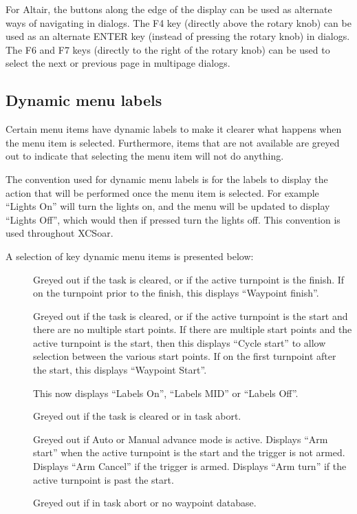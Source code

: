 \documentclass[a4paper,12pt]{refrep}
\begin{document}
For Altair, the buttons along the edge of the display can be used as
alternate ways of navigating in dialogs.  The F4 key (directly above
the rotary knob) can be used as an alternate ENTER key (instead of
pressing the rotary knob) in dialogs.  The F6 and F7 keys (directly to
the right of the rotary knob) can be used to select the next or
previous page in multipage dialogs.

\subsection*{Dynamic menu labels}
Certain menu items have dynamic labels to make it clearer what happens when the
menu item is selected.  Furthermore, items that are not available are greyed
out to indicate that selecting the menu item will not do anything.

The convention used for dynamic menu labels is for the labels to display the
action that will be performed once the menu item is selected. For example 
``Lights On'' will turn the lights on, and the menu will be updated to display
``Lights Off'', which would then if pressed turn the lights off. This
convention is used throughout XCSoar.

A selection of key dynamic menu items is presented below:
\begin{description}
\item[]  
  Greyed out if the task is cleared, or if the active turnpoint is the
  finish. If on the turnpoint prior to the finish, this displays
  ``Waypoint finish''.
\item[]  
  Greyed out if the task is cleared, or if the active turnpoint is the
  start and there are no multiple start points.  If there are multiple
  start points and the active turnpoint is the start, then this
  displays ``Cycle start'' to allow selection between the various
  start points.  If on the first turnpoint after the start, this
  displays ``Waypoint Start''.
\item[]  
  This now displays ``Labels On'', ``Labels MID'' or ``Labels Off''.
\item[]  
  Greyed out if the task is cleared or in task abort.
\item[]  
  Greyed out if Auto or Manual advance mode is active.  Displays ``Arm
  start'' when the active turnpoint is the start and the trigger is
  not armed.  Displays ``Arm Cancel'' if the trigger is armed.
  Displays ``Arm turn'' if the active turnpoint is past the start.
\item[]
  Greyed out if in task abort or no waypoint database.
\end{description}
\end{document}
